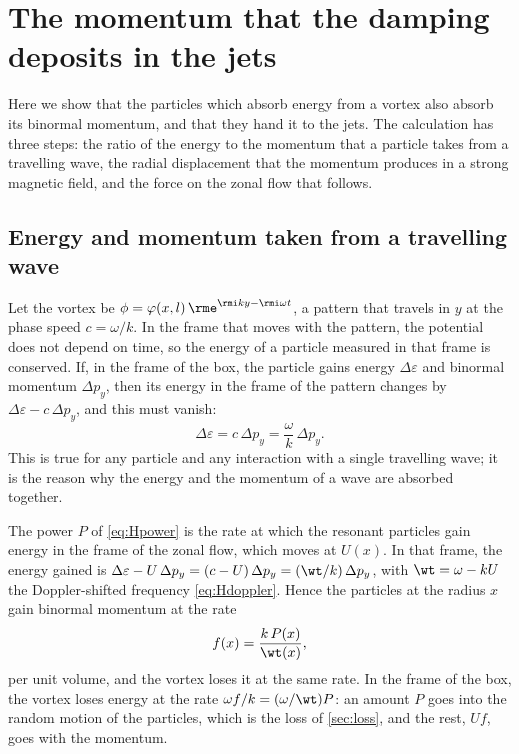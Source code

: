 \section{The momentum that the damping deposits in the jets}\label{app:momentum}

Here we show that the particles which absorb energy from a vortex also absorb its binormal momentum, and that they hand it to the jets. The calculation has three steps: the ratio of the energy to the momentum that a particle takes from a travelling wave, the radial displacement that the momentum produces in a strong magnetic field, and the force on the zonal flow that follows.

\subsection{Energy and momentum taken from a travelling wave}

Let the vortex be \(\phi = \varphi(x, l)\,\rme^{\rmi ky - \rmi\omega t}\), a pattern that travels in \(y\) at the phase speed \(c = \omega/k\). In the frame that moves with the pattern, the potential does not depend on time, so the energy of a particle measured in that frame is conserved. If, in the frame of the box, the particle gains energy \(\Delta\varepsilon\) and binormal momentum \(\Delta p_y\), then its energy in the frame of the pattern changes by \(\Delta\varepsilon - c\,\Delta p_y\), and this must vanish:
\begin{equation}
\Delta\varepsilon = c\,\Delta p_y = \frac{\omega}{k}\,\Delta p_y .
\label{eq:Iratio}
\end{equation}
This is true for any particle and any interaction with a single travelling wave; it is the reason why the energy and the momentum of a wave are absorbed together.

The power \(P\) of \cref{eq:Hpower} is the rate at which the resonant particles gain energy in the frame of the zonal flow, which moves at \(U(x)\). In that frame, the energy gained is \(\Delta\varepsilon - U\,\Delta p_y = (c - U)\,\Delta p_y = (\wt/k)\,\Delta p_y\), with \(\wt = \omega - kU\) the Doppler-shifted frequency \cref{eq:Hdoppler}. Hence the particles at the radius \(x\) gain binormal momentum at the rate
\begin{equation}
f(x) = \frac{k\,P(x)}{\wt(x)},
\label{eq:Iforce}
\end{equation}
per unit volume, and the vortex loses it at the same rate. In the frame of the box, the vortex loses energy at the rate \(\omega f/k = (\omega/\wt)P\): an amount \(P\) goes into the random motion of the particles, which is the loss of \cref{sec:loss}, and the rest, \(Uf\), goes with the momentum.

